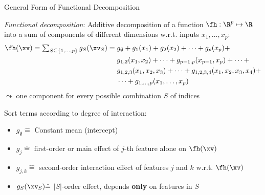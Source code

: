 \documentclass[11pt,compress,t,notes=noshow, aspectratio=169, xcolor=table]{beamer}
\newcommand{\open}{}
\newcommand{\close}{}
\begin{document}
\begin{frame}{General Form of Functional Decomposition
}


\begin{definition}
\textit{Functional decomposition}: Additive decomposition of a function $\fh: \R^p \mapsto \R$ into a sum of components of different dimensions w.r.t. inputs $x_1, \ldots, x_p$: \\
\begin{equation*}
\begin{split}
\fh(\xv) = 
\textstyle\sum_{S \subseteq \{1,\ldots,p\}} g_{S}(\xv_S) = \; & g_{\open \emptyset \close} + g_{\open 1 \close}(x_1) + g_{\open 2 \close}(x_2) + \dots + g_{\open p \close}(x_p) + \\
& g_{\open 1, 2 \close}(x_1, x_2) + \dots + g_{\open p-1, p \close}(x_{p-1}, x_p) + \dots + \\
& g_{\open 1, 2, 3 \close}(x_1, x_2, x_3) + \dots + g_{\open 1, 2, 3, 4 \close}(x_1, x_2, x_3, x_4) + \\
& \dots + g_{\open 1,\ldots,p \close}(x_1, \ldots, x_p)
\end{split}
\end{equation*}
$\leadsto$ one component for every possible combination $S$ of indices
\end{definition}
Sort terms according to degree of interaction:
\begin{itemize}
\item $g_{\open \emptyset \close} \hat = $ Constant mean (intercept) %
\item $g_{\open j \close} \hat = $ first-order or main effect of $j$-th feature alone on $\fh(\xv)$
\item $g_{\open j, k \close} \hat = $ second-order interaction effect of features $j$ and $k$ w.r.t. $\fh(\xv)$%
\item $g_{S}(\xv_S) \hat = $ $|S|$-order effect, depends \textbf{only} on features in $S$ %
\end{itemize}
\lz
\end{frame}
\end{document}
